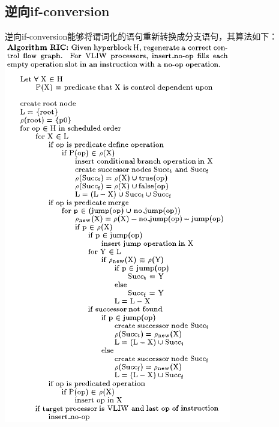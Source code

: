 \subsection{逆向if-conversion}

逆向if-conversion能够将谓词化的语句重新转换成分支语句，其算法如下：
\includegraphics[width=\linewidth]{RIC}